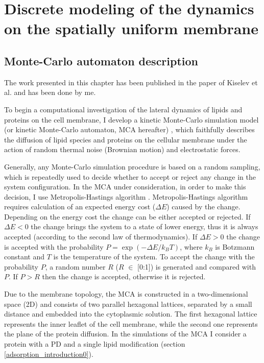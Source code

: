 \chapter{Discrete modeling of the dynamics on the spatially uniform membrane}

\label{Monte_Carlo_model_description}

\section{Monte-Carlo automaton description}

The work presented in this chapter has been published in the paper of Kiselev et al. \cite{Kiselev2011} and has been done by me.

To begin a computational investigation of the lateral dynamics of lipids and proteins on the cell membrane, I develop a kinetic Monte-Carlo simulation model (or kinetic Monte-Carlo automaton, MCA hereafter) \cite{Rubinstein2008}, which faithfully describes the diffusion of lipid species and proteins on the cellular membrane under the action of random thermal noise (Brownian motion) and electrostatic forces.

Generally, any Monte-Carlo simulation procedure is based on a random sampling, which is repeatedly used to decide whether to accept or reject any change in the system configuration. In the MCA under consideration, in order to make this decision, I use Metropolis-Hastings algorithm \cite{Metropolis1953}. Metropolis-Hastings algorithm requires calculation of an expected energy cost ($\Delta E$) caused by the change. Depending on the energy cost the change can be either accepted or rejected. If $\Delta E < 0$ the change brings the system to a state of lower energy, thus it is always accepted (according to the second law of thermodynamics). If $\Delta E > 0$ the change is accepted with the probability $P=\exp(-\Delta E/k_BT)$, where $k_B$ is Botzmann constant and $T$ is the temperature of the system. To accept the change with the probability $P$, a random number $R$ ($R$ $\in$ [0:1]) is generated and compared with $P$. If $P > R$ then the change is accepted, otherwise it is rejected.

Due to the membrane topology, the MCA is constructed in a two-dimensional space (2D) and consists of two parallel hexagonal lattices, separated by a small distance and embedded into the cytoplasmic solution. The first hexagonal lattice represents the inner leaflet of the cell membrane, while the second one represents the plane of the protein diffusion. In the simulations of the MCA I consider a protein with a PD and a single lipid modification (section \ref{adsorption_introduction0}).

